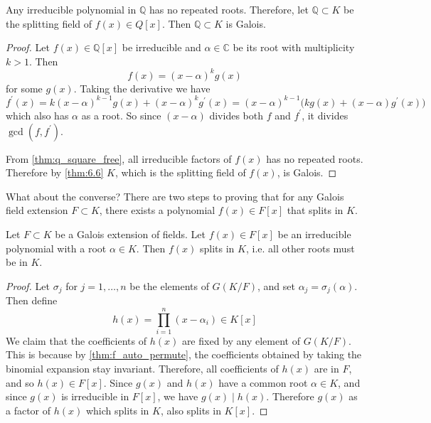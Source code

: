   \begin{theorem}
    \label{thm:q_square_free}
    \label{thm:6.8}
    Any irreducible polynomial in $\mathbb{Q}$ has no repeated roots. Therefore, let $\mathbb{Q} \subset K$ be the splitting field of $f(x) \in Q[x]$. Then $\mathbb{Q} \subset K$ is Galois. 
  \end{theorem} 
  \begin{proof}
    Let $f(x) \in \mathbb{Q}[x]$ be irreducible and $\alpha \in \mathbb{C}$ be its root with multiplicity $k > 1$. Then 
    \begin{equation}
      f(x) = (x - \alpha)^k g(x)
    \end{equation}
    for some $g(x)$. Taking the derivative we have 
    \begin{equation}
      f^\prime(x) = k (x - \alpha)^{k-1} g(x) + (x - \alpha)^k g^\prime (x) = (x - \alpha)^{k-1} \big( k g(x) + (x - \alpha) g^\prime(x) \big)
    \end{equation}
    which also has $\alpha$ as a root. So since $(x - \alpha)$ divides both $f$ and $f^\prime$, it divides $\gcd(f, f^\prime)$. 

    From \ref{thm:q_square_free}, all irreducible factors of $f(x)$ has no repeated roots. Therefore by \ref{thm:6.6} $K$, which is the splitting field of $f(x)$, is Galois. 
  \end{proof}

  What about the converse? There are two steps to proving that for any Galois field extension $F \subset K$, there exists a polynomial $f(x) \in F[x]$ that splits in $K$. 

  \begin{lemma} 
    \label{thm:6.9}
    Let $F \subset K$ be a Galois extension of fields. Let $f(x) \in F[x]$ be an irreducible polynomial with a root $\alpha \in K$. Then $f(x)$ splits in $K$, i.e. all other roots must be in $K$.  
  \end{lemma} 
  \begin{proof}
    Let $\sigma_j$ for $j = 1, \ldots, n$ be the elements of $G(K/F)$, and set $\alpha_j = \sigma_j (\alpha)$. Then define 
    \begin{equation}
      h(x) = \prod_{i=1}^n (x - \alpha_i)  \in K[x]
    \end{equation}
    We claim that the coefficients of $h(x)$ are fixed by any element of $G(K/F)$. This is because by \ref{thm:f_auto_permute}, the coefficients obtained by taking the binomial expansion stay invariant. Therefore, all coefficients of $h(x)$ are in $F$, and so $h(x) \in F[x]$. Since $g(x)$ and $h(x)$ have a common root $\alpha \in K$, and since $g(x)$ is irreducible in $F[x]$, we have $g(x) \mid h(x)$. Therefore $g(x)$ as a factor of $h(x)$ which splits in $K$, also splits in $K[x]$. 
  \end{proof}

